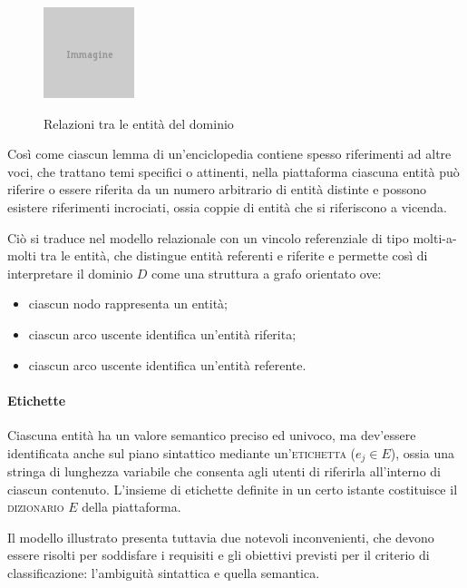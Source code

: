 \begin{figure}[ht]
	\begin{center}
		\includegraphics{placeholder.png}
		\label{fig:tesi:stage:fase-uno:entita-relazioni}
		\caption{Relazioni tra le entità del dominio}
	\end{center}
\end{figure}

Così come ciascun lemma di un'enciclopedia contiene spesso riferimenti ad altre voci, che trattano temi specifici o attinenti, nella piattaforma ciascuna entità può riferire o essere riferita da un numero arbitrario di entità distinte e possono esistere riferimenti incrociati, ossia coppie di entità che si riferiscono a vicenda.

Ciò si traduce nel modello relazionale con un vincolo referenziale di tipo molti-a-molti tra le entità, che distingue entità referenti e riferite e permette così di interpretare il dominio $D$ come una struttura a grafo orientato ove:
\begin{itemize}
\item ciascun nodo rappresenta un entità;
\item ciascun arco uscente identifica un'entità riferita;
\item ciascun arco uscente identifica un'entità referente.
\end{itemize}

\paragraph{Etichette}
Ciascuna entità ha un valore semantico preciso ed univoco, ma dev'essere identificata anche sul piano sintattico mediante un'\textsc{etichetta} ($e_j \in E$), ossia una stringa di lunghezza variabile che consenta agli utenti di riferirla all'interno di ciascun contenuto. L'insieme di etichette definite in un certo istante costituisce il \textsc{dizionario} $E$ della piattaforma.

Il modello illustrato presenta tuttavia due notevoli inconvenienti, che devono essere risolti per soddisfare i requisiti e gli obiettivi previsti per il criterio di classificazione: l'ambiguità sintattica e quella semantica.

